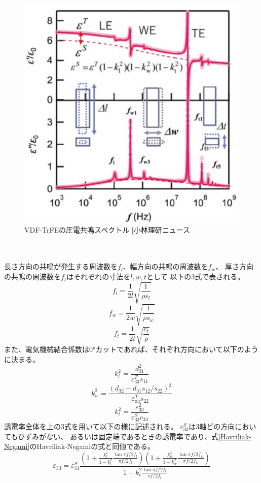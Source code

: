 \documentclass[dvipdfmx,12pt,a4paper]{jreport}
\makeatletter
\DeclareRobustCommand\cite{\unskip
    	\@ifnextchar[{\@tempswatrue\@citex}{\@tempswafalse\@citex[]}}
\makeatother
\begin{document}
			\begin{figure}[h]
				\centering
				\includegraphics[width=0.5\linewidth]{VDF_TrFe_圧電共鳴.jpg}
				\caption{VDF-TrFEの圧電共鳴スペクトル\cite{小林理研ニュース}}
				\label{VDF-TrFEの圧電共鳴スペクトル}
			\end{figure}
			\\ \\
			長さ方向の共鳴が発生する周波数を$f_l$、幅方向の共鳴の周波数を$f_w$、
			厚さ方向の共鳴の周波数を$f_t$はそれぞれの寸法を$l, w, t$として
			以下の3式で表される。
			\begin{equation}
				f_l = \frac{1}{2l}\sqrt{\frac{1}{\rho s_l}}
			\end{equation} 
			\begin{equation}
				f_w = \frac{1}{2w}\sqrt{\frac{1}{\rho s_w}}
			\end{equation}
			\begin{equation}
				f_t = \frac{1}{2t}\sqrt{\frac{c_t}{\rho}}
			\end{equation} 
			また、電気機械結合係数は0°カットであれば、それぞれ方向において以下のように決まる。
			\begin{equation}
				k_l^2 = \frac{d_{31}^2}{\varepsilon_{33}^T s_{11}}
			\end{equation}
			\begin{equation}
				k_w^2 = \frac{\left(d_{32} - d_{31}s_{12}/s_{22} \right)^2}
				{\varepsilon_{33}^T s_{22}}
			\end{equation}
			\begin{equation}
				k_t^2 = \frac{e_{33}^2}{\varepsilon_{33}^S c_{33}}
			\end{equation}
			誘電率全体を上の3式を用いて以下の様に記述される。
			$\varepsilon_{33}^S$は3軸どの方向においてもひずみがない、
			あるいは固定端であるときの誘電率であり、式\ref{Havriliak-Negami}のHavriliak-Negamiの式と同値である。
			\begin{equation}
				\varepsilon_{33} =
				\varepsilon_{33}^S
				\frac{\left(1+\frac{k_l^2}{1-k_l^2}\frac{\tan{\pi f/2f_l}}{\pi f/2f_l}\right)
				\left( 
					1+\frac{k_w^2}{1-k_w^2}\frac{\tan{\pi f/2f_w}}{\pi f/2f_w}
				\right)
				}
				{1-k_t^2\frac{\tan{\pi f/2f_t}}{\pi f/2f_t}}
				\label{normal_piezo_resonance}
			\end{equation}
\end{document}
